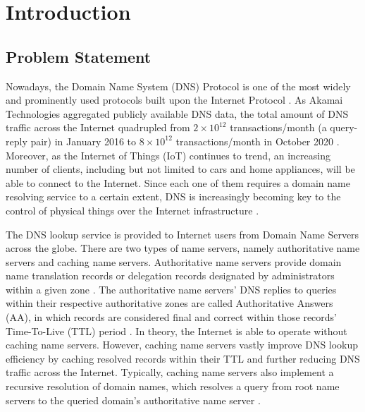 \documentclass[a4paper]{report}
\begin{document}
\tableofcontents

\newpage
\setcounter{page}{1}

\chapter{Introduction}

\section{Problem Statement}
\label{section:introduction-problemstatement}

Nowadays, the Domain Name System (DNS) Protocol is one of the most widely and prominently used protocols built upon the Internet Protocol \cite{RFC-1034}. As Akamai Technologies aggregated publicly available DNS data, the total amount of DNS traffic across the Internet quadrupled from $ 2 \times 10^{12}$ transactions/month (a query-reply pair) in January 2016 to $8 \times 10^{12}$ transactions/month in October 2020 \cite{DNS-Trends-and-Traffic}. Moreover, as the Internet of Things (IoT) continues to trend, an increasing number of clients, including but not limited to cars and home appliances, will be able to connect to the Internet. Since each one of them requires a domain name resolving service to a certain extent, DNS is increasingly becoming key to the control of physical things over the Internet infrastructure \cite{satam2015anomaly}.

The DNS lookup service is provided to Internet users from Domain Name Servers across the globe. There are two types of name servers, namely authoritative name servers and caching name servers. Authoritative name servers provide domain name translation records or delegation records designated by administrators within a given zone \cite{BCP-219}. The authoritative name servers' DNS replies to queries within their respective authoritative zones are called Authoritative Answers (AA), in which records are considered final and correct within those records' Time-To-Live (TTL) period \cite{BCP-219, RFC-1035}. In theory, the Internet is able to operate without caching name servers. However, caching name servers vastly improve DNS lookup efficiency by caching resolved records within their TTL and further reducing DNS traffic across the Internet. Typically, caching name servers also implement a recursive resolution of domain names, which resolves a query from root name servers to the queried domain's authoritative name server \cite{finch-2015}.
\end{document}
